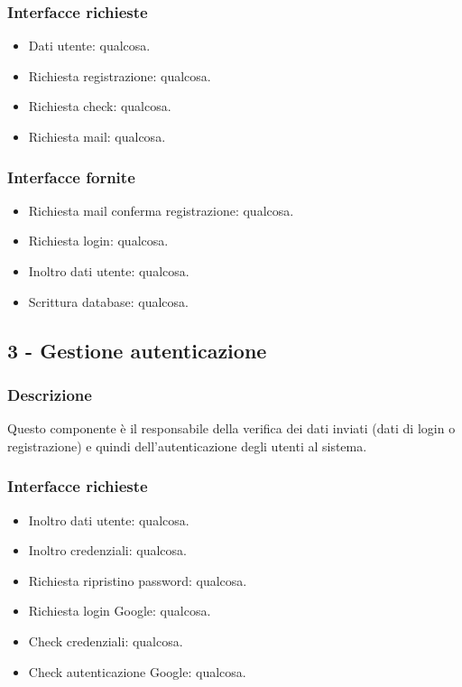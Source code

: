\documentclass[a4paper,12pt]{article}
\begin{document}
\subsubsection*{Interfacce richieste}
\begin{itemize} \setlength\itemsep{0.01em}
\item {\sffamily Dati utente}: qualcosa.
\item {\sffamily Richiesta registrazione}: qualcosa.
\item {\sffamily Richiesta check}: qualcosa.
\item {\sffamily Richiesta mail}: qualcosa.
\end{itemize}

\subsubsection*{Interfacce fornite}
\begin{itemize} \setlength\itemsep{0.01em}
\item {\sffamily Richiesta mail conferma registrazione}: qualcosa.
\item {\sffamily Richiesta login}: qualcosa.
\item {\sffamily Inoltro dati utente}: qualcosa.
\item {\sffamily Scrittura database}: qualcosa.
\end{itemize}

\subsection*{3 - Gestione autenticazione}
\subsubsection*{Descrizione}
Questo componente è il responsabile della verifica dei dati inviati (dati di login o registrazione) e quindi dell’autenticazione degli utenti al sistema.
\subsubsection*{Interfacce richieste}
\begin{itemize} \setlength\itemsep{0.01em}
\item {\sffamily Inoltro dati utente}: qualcosa.
\item {\sffamily Inoltro credenziali}: qualcosa.
\item {\sffamily Richiesta ripristino password}: qualcosa.
\item {\sffamily Richiesta login Google}: qualcosa.
\item {\sffamily Check credenziali}: qualcosa.
\item {\sffamily Check autenticazione Google}: qualcosa.
\end{itemize}
\end{document}
